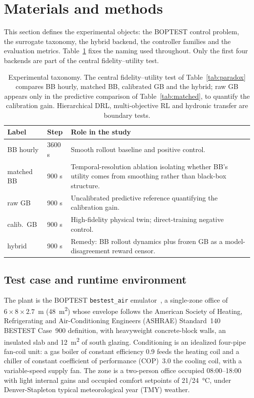 \section{Materials and methods}\label{sec:methods}

This section defines the experimental objects: the BOPTEST control problem, the surrogate taxonomy,
the hybrid backend, the controller families and the evaluation metrics. Table~\ref{tab:taxonomy}
fixes the naming used throughout. Only the first four backends are part of the central
fidelity--utility test.

\begin{table}[!t]
\centering
\caption{Experimental taxonomy. The central fidelity--utility test of Table~\ref{tab:paradox}
compares BB hourly, matched BB, calibrated GB and the hybrid; raw GB appears only in the predictive
comparison of Table~\ref{tab:matched}, to quantify the calibration gain. Hierarchical DRL,
multi-objective RL and hydronic transfer are boundary tests.}
\small
\begin{tabularx}{\linewidth}{@{}p{14mm}p{13mm}X@{}}
\toprule
Label & Step & Role in the study \\
\midrule
BB hourly & 3600 s & Smooth rollout baseline and positive control. \\
matched BB & 900 s & Temporal-resolution ablation isolating whether BB's utility comes from smoothing rather than black-box structure. \\
raw GB & 900 s & Uncalibrated predictive reference quantifying the calibration gain. \\
calib.\ GB & 900 s & High-fidelity physical twin; direct-training negative control. \\
hybrid & 900 s & Remedy: BB rollout dynamics plus frozen GB as a model-disagreement reward censor. \\
\bottomrule
\end{tabularx}
\label{tab:taxonomy}
\end{table}

\subsection{Test case and runtime environment}\label{ssec:testcase}
The plant is the BOPTEST \texttt{bestest\_air} emulator~\cite{Blum2021BOPTEST,Wetter2014Modelica}, a
single-zone office of $6\times8\times2.7$~m (\SI{48}{\meter\squared}) whose envelope follows the
American Society of Heating, Refrigerating and Air-Conditioning Engineers (ASHRAE) Standard~140 BESTEST Case~900 definition, with heavyweight concrete-block walls, an insulated
slab and \SI{12}{\meter\squared} of south glazing. Conditioning is an idealized four-pipe fan-coil
unit: a gas boiler of constant efficiency 0.9 feeds the heating coil and a chiller of constant
coefficient of performance (COP)~3.0 the cooling coil, with a variable-speed supply fan. The zone is a two-person office occupied
08:00--18:00 with light internal gains and occupied comfort setpoints of 21/\SI{24}{\celsius}, under
Denver-Stapleton typical meteorological year (TMY) weather.

